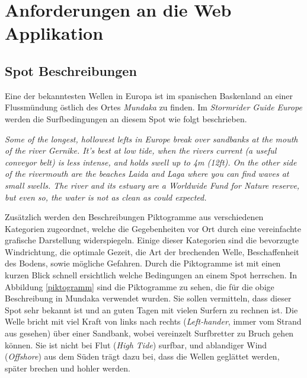 
\chapter{Anforderungen an die Web Applikation}

\section{Spot Beschreibungen}

Eine der bekanntesten Wellen in Europa ist im spanischen Baskenland an
einer Fluss\-mündung östlich des Ortes \textit{Mundaka} zu finden. Im
\textit{Stormrider Guide Europe} \cite[S.180]{storm_europe_1998}
werden die Surfbedingungen an diesem Spot wie folgt beschrieben.

\vspace{0.2cm}

\textit{Some of the longest, hollowest lefts in Europe break over
  sandbanks at the mouth of the river Gernike. It's best at low tide,
  when the rivers current (a useful conveyor belt) is less intense,
  and holds swell up to 4m (12ft). On the other side of the rivermouth
  are the beaches Laida and Laga where you can find waves at small
  swells. The river and its estuary are a Worldwide Fund for Nature
  reserve, but even so, the water is not as clean as could expected.
}

\vspace{0.2cm}

Zusätzlich werden den Beschreibungen Piktogramme aus verschiedenen
Kategorien zugeordnet, welche die Gegebenheiten vor Ort durch eine
vereinfachte grafische Darstellung widerspiegeln. Einige dieser
Kategorien sind die bevorzugte Windrichtung, die optimale Gezeit, die
Art der brechenden Welle, Beschaffenheit des Bodens, sowie mögliche
Gefahren. Durch die Piktogramme ist mit einen kurzen Blick schnell
ersichtlich welche Bedingungen an einem Spot herrschen. In Abbildung
\ref{piktogramm} sind die Piktogramme zu sehen, die für die obige
Beschreibung in Mundaka verwendet wurden. Sie sollen vermitteln, dass
dieser Spot sehr bekannt ist und an guten Tagen mit vielen Surfern zu
rechnen ist. Die Welle bricht mit viel Kraft von links nach rechts
(\textit{Left-hander}, immer vom Strand aus gesehen) über einer
Sandbank, wobei vereinzelt Surfbretter zu Bruch gehen können.  Sie ist
nicht bei Flut (\textit{High Tide}) surfbar, und ablandiger Wind
(\textit{Offshore}) aus dem Süden trägt dazu bei, dass die Wellen
geglättet werden, später brechen und hohler werden.

